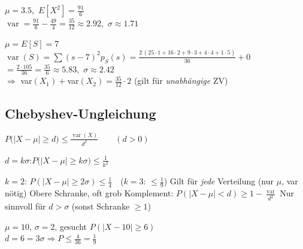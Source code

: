 \begin{bsp}[{{Würfel: $X$ = Augenzahl}}]
$\mu=3.5$,\ $E[X^2]=\frac{91}{6}$\\
$\operatorname{var}=\frac{91}{6}-\frac{49}{4}=\frac{35}{12}\approx2.92$,\ $\sigma\approx1.71$
\end{bsp}

\begin{bsp}[{{Summe zweier Würfel $S=X_1+X_2$}}]
$\mu=E[S]=7$\\
$\operatorname{var}(S)=\sum(s-7)^2p_S(s)=\frac{2\,(25\cdot1+16\cdot2+9\cdot3+4\cdot4+1\cdot5)}{36}+0$\\
$=\frac{2\cdot105}{36}=\frac{35}{6}\approx5.83$,\ $\sigma\approx2.42$\\
$\Rightarrow$ var$(X_1)+$var$(X_2)=\frac{35}{12}\cdot2$ (gilt für \emph{unabhängige} ZV)
\end{bsp}

\subsection{Chebyshev-Ungleichung}
\begin{formel}
$\displaystyle P\big(|X-\mu|\ge d\big)\le\frac{\operatorname{var}(X)}{d^2}\qquad(d>0)$
\end{formel}
\begin{formel}
$d=k\sigma$:\quad $\displaystyle P\big(|X-\mu|\ge k\sigma\big)\le\frac1{k^2}$
\end{formel}
\begin{itemize}
\pfeil $k=2$: $P(|X-\mu|\ge2\sigma)\le\frac14$\ \ ($k=3$: $\le\frac19$)
\pfeil Gilt für \emph{jede} Verteilung (nur $\mu$, var nötig)
\pfeil Obere Schranke, oft grob
\pfeil Komplement: $P(|X-\mu|<d)\ge1-\frac{\operatorname{var}}{d^2}$
\pfeil Nur sinnvoll für $d>\sigma$ (sonst Schranke $\ge1$)
\end{itemize}
\begin{bsp}
$\mu=10$, $\sigma=2$, gesucht $P(|X-10|\ge6)$\\
$d=6=3\sigma\Rightarrow P\le\frac{4}{36}=\frac19$
\end{bsp}

